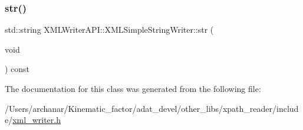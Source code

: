 \subsubsection{\texorpdfstring{str()}{str()}\hspace{0.1cm}{\footnotesize\ttfamily [2/2]}}
{\footnotesize\ttfamily std\+::string X\+M\+L\+Writer\+A\+P\+I\+::\+X\+M\+L\+Simple\+String\+Writer\+::str (\begin{DoxyParamCaption}\item[{void}]{ }\end{DoxyParamCaption}) const\hspace{0.3cm}{\ttfamily [inline]}}



The documentation for this class was generated from the following file\+:\begin{DoxyCompactItemize}
\item 
/\+Users/archanar/\+Kinematic\+\_\+factor/adat\+\_\+devel/other\+\_\+libs/xpath\+\_\+reader/include/\mbox{\hyperlink{other__libs_2xpath__reader_2include_2xml__writer_8h}{xml\+\_\+writer.\+h}}\end{DoxyCompactItemize}
